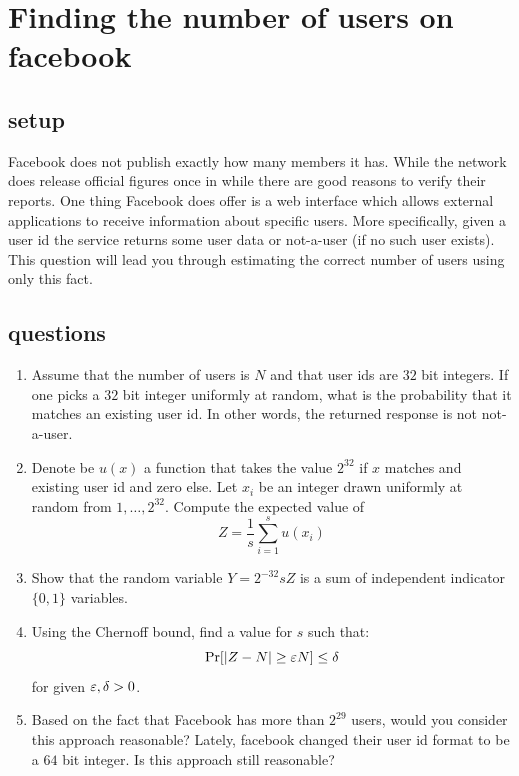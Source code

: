 \documentclass{article}
\begin{document}

\section{Finding the number of users on facebook}
\subsection*{setup}
Facebook does not publish exactly how many members it has. 
While the network does release official figures once in while there are good reasons to verify their reports.
One thing Facebook does offer is a web interface which allows external applications to receive information about specific users.
More specifically, given a user id the service returns some user data or not-a-user (if no such user exists).
This question will lead you through estimating the correct number of users using only this fact.
\subsection*{questions}
\begin{enumerate}
\item Assume that the number of users is $N$ and that user ids are $32$ bit integers.
If one picks a $32$ bit integer uniformly at random, what is the probability that it matches an existing user id. In other words, the returned response is not not-a-user.
\item Denote be $u(x)$ a function that takes the value $2^{32}$ if $x$ matches and existing user id and zero else.
Let $x_i$ be an integer drawn uniformly at random from $1,\ldots,2^{32}$. Compute the expected value of $$Z = \frac{1}{s}\sum_{i=1}^{s} u(x_i)$$
\item Show that the random variable $Y = 2^{-32}sZ$ is a sum of independent indicator $\{0,1\}$ variables.
\item Using the Chernoff bound, find a value for $s$ such that: $$\Pr[|Z-N| \ge \varepsilon N] \le \delta$$ for given $\varepsilon,\delta >0$.
\item Based on the fact that Facebook has more than $2^{29}$ users, would you consider this approach reasonable?
Lately, facebook changed their user id format to be a $64$ bit integer. Is this approach still reasonable?
\end{enumerate}

\pagebreak
\end{document}
